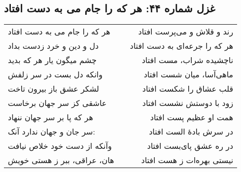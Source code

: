 \begin{center}
\section*{غزل شماره ۴۴: هر که را جام می به دست افتاد}
\label{sec:044}
\begin{longtable}{l p{0.5cm} r}
هر که را جام می به دست افتاد
&&
رند و قلاش و می‌پرست افتاد
\\
دل و دین و خرد زدست بداد
&&
هر که را جرعه‌ای به دست افتاد
\\
چشم میگون یار هر که بدید
&&
ناچشیده شراب، مست افتاد
\\
وانکه دل بست در سر زلفش
&&
ماهی‌آسا، میان شست افتاد
\\
لشکر عشق باز بیرون تاخت
&&
قلب عشاق را شکست افتاد
\\
عاشقی کز سر جهان برخاست
&&
زود با دوستش نشست افتاد
\\
هر که پا بر سر جهان ننهاد
&&
همت او عظیم پست افتاد
\\
سر جان و جهان ندارد آنک:
&&
در سرش بادهٔ الست افتاد
\\
وآنکه از دست خود خلاص نیافت
&&
در ره عشق پای‌بست افتاد
\\
هان، عراقی، ببر ز هستی خویش
&&
نیستی بهره‌ات ز هست افتاد
\\
\end{longtable}
\end{center}
